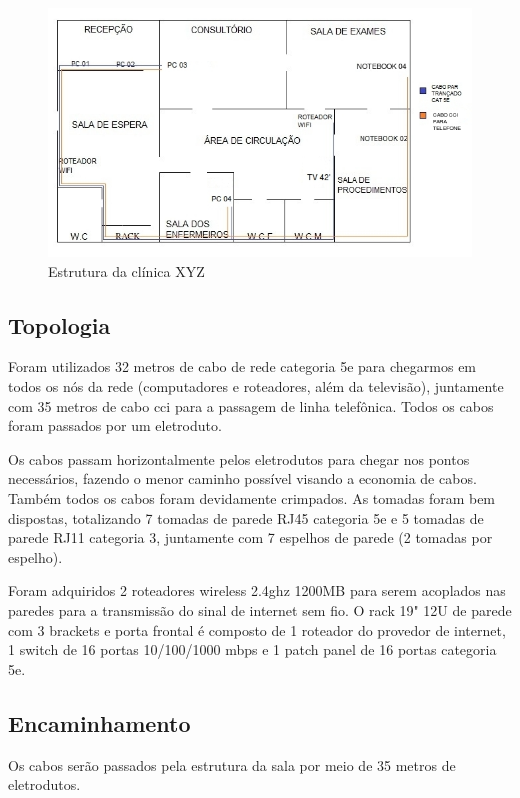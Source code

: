 \documentclass[	DIV=calc,%
							paper=a4,%
							fontsize=12pt,%
							onecolumn]{scrartcl}	 					%
\begin{document}
\begin{figure}
	
	\centering
	\includegraphics[width=\textwidth]{XYZ}
	\caption{Estrutura da clínica XYZ}
	\label{XYZ}
\end{figure}

\subsection{Topologia}

Foram utilizados 32 metros de cabo de rede categoria 5e para chegarmos em todos os nós da rede (computadores e roteadores, além da televisão), juntamente com 35 metros de cabo cci para a passagem de linha telefônica. Todos os cabos foram passados por um eletroduto. 

Os cabos passam horizontalmente pelos eletrodutos para chegar nos pontos necessários, fazendo o menor caminho possível visando a economia de cabos. Também todos os cabos foram devidamente crimpados. As tomadas foram bem dispostas, totalizando 7 tomadas de parede RJ45 categoria 5e e 5 tomadas de parede RJ11 categoria 3, juntamente com 7 espelhos de parede (2 tomadas por espelho).

Foram adquiridos 2 roteadores wireless 2.4ghz 1200MB para serem acoplados nas paredes para a transmissão do sinal de internet sem fio. O rack 19" 12U de parede com 3 brackets e porta frontal é composto de 1 roteador do provedor de internet, 1 switch de 16 portas 10/100/1000 mbps e 1 patch panel de 16 portas categoria 5e.


\subsection{Encaminhamento}
Os cabos serão passados pela estrutura da sala por meio de 35 metros de eletrodutos.
\end{document}

